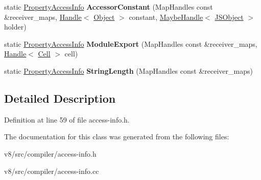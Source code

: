 \begin{DoxyCompactItemize}
\item 
\mbox{\label{classv8_1_1internal_1_1compiler_1_1PropertyAccessInfo_a360060d3cf9c028601e8a936a3eb555d}} 
static \mbox{\hyperlink{classv8_1_1internal_1_1compiler_1_1PropertyAccessInfo}{Property\+Access\+Info}} {\bfseries Accessor\+Constant} (Map\+Handles const \&receiver\+\_\+maps, \mbox{\hyperlink{classv8_1_1internal_1_1Handle}{Handle}}$<$ \mbox{\hyperlink{classv8_1_1internal_1_1Object}{Object}} $>$ constant, \mbox{\hyperlink{classv8_1_1internal_1_1MaybeHandle}{Maybe\+Handle}}$<$ \mbox{\hyperlink{classv8_1_1internal_1_1JSObject}{J\+S\+Object}} $>$ holder)
\item 
\mbox{\label{classv8_1_1internal_1_1compiler_1_1PropertyAccessInfo_af7226e047f94c8b32ee63b9f87a21d9b}} 
static \mbox{\hyperlink{classv8_1_1internal_1_1compiler_1_1PropertyAccessInfo}{Property\+Access\+Info}} {\bfseries Module\+Export} (Map\+Handles const \&receiver\+\_\+maps, \mbox{\hyperlink{classv8_1_1internal_1_1Handle}{Handle}}$<$ \mbox{\hyperlink{classv8_1_1internal_1_1Cell}{Cell}} $>$ cell)
\item 
\mbox{\label{classv8_1_1internal_1_1compiler_1_1PropertyAccessInfo_a78f9e2274f564d9a937ee1d2a1eb9c5c}} 
static \mbox{\hyperlink{classv8_1_1internal_1_1compiler_1_1PropertyAccessInfo}{Property\+Access\+Info}} {\bfseries String\+Length} (Map\+Handles const \&receiver\+\_\+maps)
\end{DoxyCompactItemize}


\subsection{Detailed Description}


Definition at line 59 of file access-\/info.\+h.



The documentation for this class was generated from the following files\+:\begin{DoxyCompactItemize}
\item 
v8/src/compiler/access-\/info.\+h\item 
v8/src/compiler/access-\/info.\+cc\end{DoxyCompactItemize}
